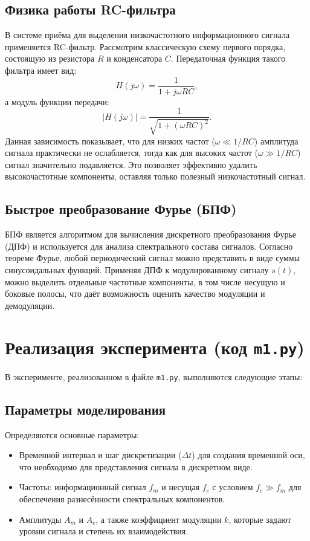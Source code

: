 \documentclass[12pt]{article}
\begin{document}
\subsection{Физика работы RC-фильтра}
В системе приёма для выделения низкочастотного информационного сигнала применяется RC-фильтр. Рассмотрим классическую схему первого порядка, состоящую из резистора \(R\) и конденсатора \(C\). Передаточная функция такого фильтра имеет вид:
\[
H(j\omega) = \frac{1}{1+j\omega RC},
\]
а модуль функции передачи:
\[
|H(j\omega)| = \frac{1}{\sqrt{1+(\omega RC)^2}}.
\]
Данная зависимость показывает, что для низких частот (\(\omega \ll 1/RC\)) амплитуда сигнала практически не ослабляется, тогда как для высоких частот (\(\omega \gg 1/RC\)) сигнал значительно подавляется. Это позволяет эффективно удалить высокочастотные компоненты, оставляя только полезный низкочастотный сигнал.

\subsection{Быстрое преобразование Фурье (БПФ)}
БПФ является алгоритмом для вычисления дискретного преобразования Фурье (ДПФ) и используется для анализа спектрального состава сигналов. Согласно теореме Фурье, любой периодический сигнал можно представить в виде суммы синусоидальных функций. Применяя ДПФ к модулированному сигналу \(s(t)\), можно выделить отдельные частотные компоненты, в том числе несущую и боковые полосы, что даёт возможность оценить качество модуляции и демодуляции.

\section{Реализация эксперимента (код \texttt{m1.py})}
В эксперименте, реализованном в файле \texttt{m1.py}, выполняются следующие этапы:

\subsection{Параметры моделирования}
Определяются основные параметры:
\begin{itemize}
    \item Временной интервал и шаг дискретизации (\(\Delta t\)) для создания временной оси, что необходимо для представления сигнала в дискретном виде.
    \item Частоты: информационный сигнал \(f_m\) и несущая \(f_c\) с условием \(f_c \gg f_m\) для обеспечения разнесённости спектральных компонентов.
    \item Амплитуды \(A_m\) и \(A_c\), а также коэффициент модуляции \(k\), которые задают уровни сигнала и степень их взаимодействия.
\end{itemize}
\end{document}
